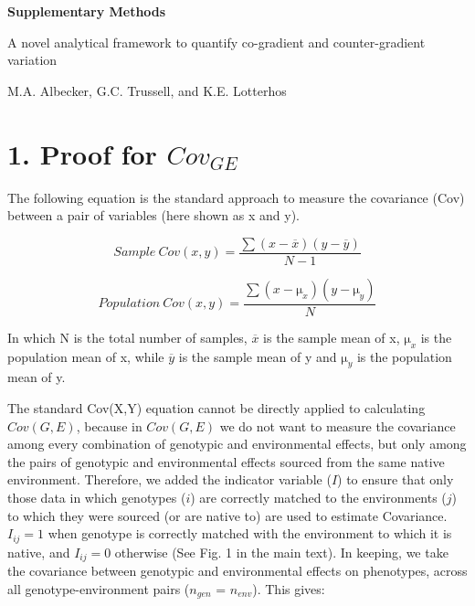 \documentclass[11pt, oneside]{amsart}
\begin{document}


{ \Large \bf Supplementary Methods}

A novel analytical framework to quantify co-gradient and counter-gradient variation 

M.A. Albecker, G.C. Trussell, and K.E. Lotterhos

\hspace{3cm}

\tableofcontents
\listoffigures

\newpage

\renewcommand\thesection{Supplemental Methods}

\section{1. Proof for $Cov_{GE}$}

The following equation is the standard approach to measure the covariance (Cov) between a pair of variables (here shown as x and y).

\begin{equation}
Sample\:Cov(x,y) =  \frac{\sum (x - \overline{x})(y - \overline{y})}{N-1}
\end{equation}

\begin{equation}
Population\:Cov(x,y) =  \frac{\sum (x - \si\micro_{x})(y - \si\micro_{y})}{N}
\end{equation}

In which N is the total number of samples, $\overline{x}$ is the sample mean of x, $\si\micro_{x}$ is the population mean of x, while $\overline{y}$ is the sample mean of y and $\si\micro_{y}$ is the population mean of y. 

The standard Cov(X,Y) equation cannot be directly applied to calculating $Cov(G,E)$, because in $Cov(G,E)$ we do not want to measure the covariance among every combination of genotypic and environmental effects, but only among the pairs of genotypic and environmental effects sourced from the same native environment. Therefore, we added the indicator variable ($I$) to ensure that only those data in which genotypes ($i$) are correctly matched to the environments ($j$) to which they were sourced (or are native to) are used to estimate Covariance.  $I_{ij} = 1$ when genotype is correctly matched with the environment to which it is native, and $I_{ij} = 0$ otherwise (See Fig. 1 in the main text). In keeping, we take the covariance between genotypic and environmental effects on phenotypes, across all genotype-environment pairs ($n_{gen}$ = $n_{env}$). This gives: 
\end{document}
